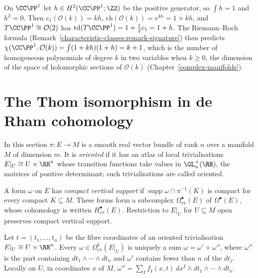 \begin{example}\label{characteristic-classes:example-chern-character-cp1}
On $\CC\PP^1$ let $h \in H^2(\CC\PP^1; \ZZ)$ be the positive generator, so $\int h = 1$ and $h^2 = 0$. Then $c_1(\mathcal{O}(k)) = kh$, $\mathrm{ch}(\mathcal{O}(k)) = e^{kh} = 1 + kh$, and
$T\CC\PP^1 \cong \mathcal{O}(2)$ has $\mathrm{td}(T\CC\PP^1) = 1 + \frac12c_1 = 1 + h$. The Riemann--Roch formula (Remark~\ref{characteristic-classes:remark-signature}) then predicts
$\chi(\CC\PP^1, \mathcal{O}(k)) = \int(1 + kh)(1 + h) = k + 1$, which is the number of homogeneous polynomials of degree $k$ in two variables when $k \geq 0$, the dimension of
the space of holomorphic sections of $\mathcal{O}(k)$ (Chapter~\ref{complex-manifolds}).
\end{example}

\section{The Thom isomorphism in de Rham cohomology}\label{characteristic-classes:section-thom}

In this section $\pi \colon E \to M$ is a smooth real vector bundle of rank $n$ over a manifold $M$ of dimension $m$. It is \emph{oriented} if it has an atlas of local trivialisations $E|_U \cong U \times \RR^n$ whose transition
functions take values in $\GL_n^+(\RR)$, the matrices of positive determinant; such trivialisations are called oriented.

\begin{definition}\label{characteristic-classes:definition-vertical-support}
A form $\omega$ on $E$ has \emph{compact vertical support} if $\operatorname{supp}\omega \cap \pi^{-1}(K)$ is compact for every compact $K \subseteq M$. These forms form a subcomplex $\Omega^\bullet_{\mathrm{cv}}(E)$ of $\Omega^\bullet(E)$,
whose cohomology is written $H^\bullet_{\mathrm{cv}}(E)$. Restriction to $E|_U$ for $U \subseteq M$ open preserves compact vertical support.
\end{definition}

Let $t = (t_1, \ldots, t_n)$ be the fibre coordinates of an oriented trivialisation $E|_U \cong U \times \RR^n$. Every $\omega \in \Omega^k_{\mathrm{cv}}(E|_U)$ is uniquely a sum $\omega = \omega' + \omega''$, where $\omega''$ is the part containing
$dt_1 \wedge \cdots \wedge dt_n$ and $\omega'$ contains fewer than $n$ of the $dt_j$. Locally on $U$, in coordinates $x$ of $M$, $\omega'' = \sum_If_I(x, t)\,dx^I \wedge dt_1 \wedge \cdots \wedge dt_n$.

